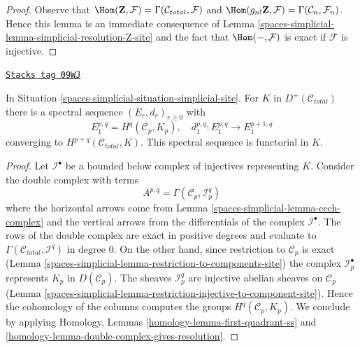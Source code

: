 \begin{proof}
Observe that
$\Hom(\mathbf{Z}, \mathcal{F}) = \Gamma(\mathcal{C}_{total}, \mathcal{F})$
and
$\Hom(g_{n!}\mathbf{Z}, \mathcal{F}) = \Gamma(\mathcal{C}_n, \mathcal{F}_n)$.
Hence this lemma is an immediate consequence of
Lemma \ref{spaces-simplicial-lemma-simplicial-resolution-Z-site}
and the fact that $\Hom(-, \mathcal{F})$ is exact if
$\mathcal{F}$ is injective.
\end{proof}

\begin{lemma}
\label{spaces-simplicial-lemma-simplicial-sheaf-cohomology-site}
\href{https://stacks.math.columbia.edu/tag/09WJ}{\texttt{Stacks tag 09WJ}}

In Situation \ref{spaces-simplicial-situation-simplicial-site}. For $K$ in
$D^+(\mathcal{C}_{total})$ there is a spectral sequence
$(E_r, d_r)_{r \geq 0}$ with
$$
E_1^{p, q} = H^q(\mathcal{C}_p, K_p),\quad
d_1^{p, q} : E_1^{p, q} \to E_1^{p + 1, q}
$$
converging to $H^{p + q}(\mathcal{C}_{total}, K)$.
This spectral sequence is functorial in $K$.
\end{lemma}

\begin{proof}
Let $\mathcal{I}^\bullet$ be a bounded below complex of injectives
representing $K$. Consider the double complex with terms
$$
A^{p, q} = \Gamma(\mathcal{C}_p, \mathcal{I}^q_p)
$$
where the horizontal arrows come from Lemma \ref{spaces-simplicial-lemma-cech-complex}
and the vertical arrows from the differentials of the
complex $\mathcal{I}^\bullet$. The rows of the double complex are exact
in positive degrees and evaluate to
$\Gamma(\mathcal{C}_{total}, \mathcal{I}^q)$ in degree $0$.
On the other hand, since restriction to $\mathcal{C}_p$ is exact
(Lemma \ref{spaces-simplicial-lemma-restriction-to-components-site})
the complex $\mathcal{I}_p^\bullet$ represents $K_p$ in
$D(\mathcal{C}_p)$. The sheaves $\mathcal{I}_p^q$ are injective
abelian sheaves on $\mathcal{C}_p$
(Lemma \ref{spaces-simplicial-lemma-restriction-injective-to-component-site}).
Hence the cohomology of the columns computes the groups
$H^q(\mathcal{C}_p, K_p)$. We conclude by applying
Homology, Lemmas \ref{homology-lemma-first-quadrant-ss} and
\ref{homology-lemma-double-complex-gives-resolution}.
\end{proof}

